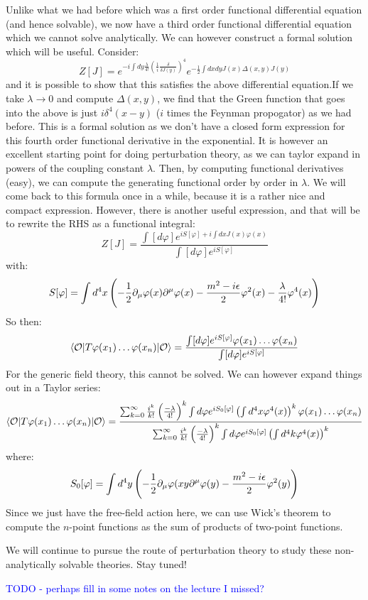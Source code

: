 Unlike what we had before which was a first order functional differential equation (and hence solvable), we now have a third order functional differential equation which we cannot solve analytically. We can however construct a formal solution which will be useful. Consider:
\begin{equation}
    Z[J] = e^{-i\int dy \frac{\lambda}{4!}\left(\frac{1}{i}\frac{\delta}{\delta J(y)}\right)^4}e^{-\frac{1}{2}\int dxdy J(x)\Delta(x, y)J(y)}
\end{equation}
and it is possible to show that this satisfies the above differential equation.If we take $\lambda \to 0$ and compute $\Delta(x, y)$, we find that the Green function that goes into the above is just $i\delta^4(x- y)$ ($i$ times the Feynman propogator) as we had before. This is a formal solution as we don't have a closed form expression for this fourth order functional derivative in the exponential. It is however an excellent starting point for doing perturbation theory, as we can taylor expand in powers of the coupling constant $\lambda$. Then, by computing functional derivatives (easy), we can compute the generating functional order by order in $\lambda$. We will come back to this formula once in a while, because it is a rather nice and compact expression. However, there is another useful expression, and that will be to rewrite the RHS as a functional integral:
\begin{equation}
    Z[J] = \frac{\int [d\varphi] e^{iS[\varphi] + i\int dx J(x)\varphi(x)}}{\int [d\varphi]e^{iS[\varphi]}}
\end{equation}
with:
\begin{equation}
    S[\varphi] = \int d^4x \left(-\frac{1}{2}\p_\mu \varphi(x) \p^\mu \varphi(x) - \frac{m^2 - i\e}{2}\varphi^2(x) - \frac{\lambda}{4!}\varphi^4(x)\right)
\end{equation}
So then:
\begin{equation}
    \bra{\O}T\varphi(x_1) \ldots \varphi(x_n)\ket{\O} = \frac{\int [d\varphi]e^{iS[\varphi]}\varphi(x_1)\ldots \varphi(x_n)}{\int [d\varphi]e^{iS[\varphi]}}
\end{equation}
For the generic field theory, this cannot be solved. We can however expand things out in a Taylor series:
\begin{equation}
    \bra{\O}T\varphi(x_1) \ldots \varphi(x_n)\ket{\O} = \frac{\sum_{k=0}^\infty \frac{i^k}{k!}\left(\frac{-\lambda}{4!}\right)^k \int d\varphi e^{iS_0[\varphi]} \left(\int d^4x \varphi^4(x)\right)^k \varphi(x_1)\ldots\varphi(x_n)}{\sum_{k=0}^\infty \frac{i^k}{k!}\left(\frac{-\lambda}{4!}\right)^k \int d\varphi e^{iS_0[\varphi]}\left(\int d^4k \varphi^4(x)\right)^k}
\end{equation}
where:
\begin{equation}
    S_0[\varphi] = \int d^4y \left(-\frac{1}{2}\p_\mu \varphi(xy \p^\mu \varphi(y) - \frac{m^2 - i\e}{2}\varphi^2(y)\right)
\end{equation}
Since we just have the free-field action here, we can use Wick's theorem to compute the $n$-point functions as the sum of products of two-point functions.

We will continue to pursue the route of perturbation theory to study these non-analytically solvable theories. Stay tuned!

\textcolor{blue}{TODO - perhaps fill in some notes on the lecture I missed?}